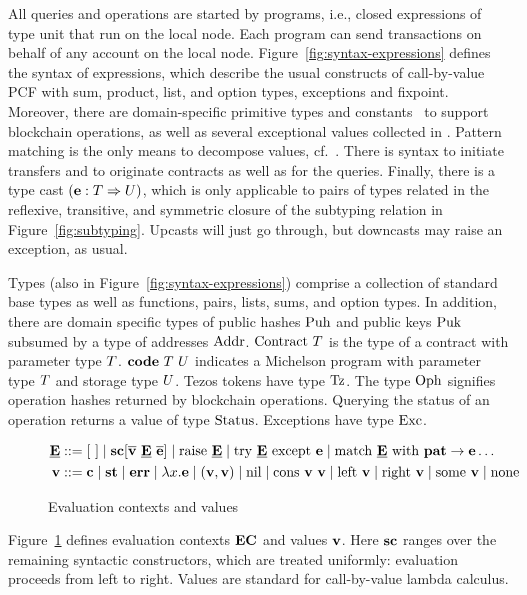 \documentclass[a4paper]{llncs}
\begin{document}
All queries and operations are started by programs, i.e., closed
expressions of type unit that run on the
local node. Each program can send transactions on behalf of any
account on the local node.  Figure~\ref{fig:syntax-expressions} defines the syntax of
expressions, which describe the usual constructs of call-by-value PCF
with sum, product, list, and option types, exceptions and fixpoint. Moreover, there are
domain-specific primitive types and constants \CONSTANT\ to support blockchain
operations, as well as several exceptional values collected in \ERROR.
Pattern matching is the only means to decompose values, cf.\ \PATTERN.
There is syntax to initiate transfers and to originate contracts as
well as for the queries. Finally, there is a type cast
$(\textbf{e} : T \Rightarrow U)$, which is only applicable to pairs of
types related in the reflexive, transitive, and symmetric closure of
the subtyping relation in Figure~\ref{fig:subtyping}. Upcasts will
just go through, but downcasts may raise an exception, as usual.

Types (also in Figure~\ref{fig:syntax-expressions}) comprise a
collection of standard base types as well as 
functions, pairs, lists, sums, and option types. In addition, there
are domain specific types of public hashes $\text{Puh}$ and public keys $\text{Puk}$ subsumed by
a type of addresses $\text{Addr}$. $\text{Contract}\ T$ is the type of
a contract with parameter type $T$. $\textbf{code}\ T\ U$
indicates a Michelson program with parameter type $T$ and storage
type $U$. Tezos tokens have type $\text{Tz}$. The type $\text{Oph}$ signifies operation hashes
returned by blockchain operations. Querying the status of an operation
returns a value of type $\text{Status}$. Exceptions have type
$\text{Exc}$. 

\begin{figure}[tp]
\begin{align*}
  \ECN{} & :: = \ECHOLE \mid \SC[\overline\VAL\ \ECN{}\ \overline\EXPR] \mid \RAISE\ \ECN{} \mid \TRY\ \ECN{}\ \EXCEPT\ \EXPR
  \mid \MATCH\ \ECN{}\ \WITH\ \PATTERN\to\EXPR \dots
  \\
  \VAL & ::= \CONSTANT \mid \STATUS \mid \ERROR \mid \lambda x.\EXPR \mid(\VAL, \VAL) \mid
         \NIL \mid \CONS\ \VAL\ \VAL \mid \LEFT\ \VAL \mid \RIGHT\
         \VAL \mid \SOME\ \VAL\mid \NONE
\end{align*}
  \caption{Evaluation contexts and values}
  \label{fig:evaluation-contexts-values}
\end{figure}
Figure~\ref{fig:evaluation-contexts-values} defines evaluation
contexts $\textbf{EC}$ and values $\textbf{v}$.
Here $\textbf{sc}$ ranges over the remaining syntactic constructors, which are
treated uniformly: evaluation proceeds from left to right. Values are
standard for call-by-value lambda calculus.
\end{document}
